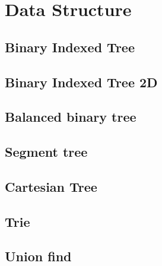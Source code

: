 \newpage
\section{Data Structure}

\subsection{Binary Indexed Tree}


\subsection{Binary Indexed Tree 2D}


\subsection{Balanced binary tree}

\subsection{Segment tree}


\subsection{Cartesian Tree}


\subsection{Trie}


\subsection{Union find}
